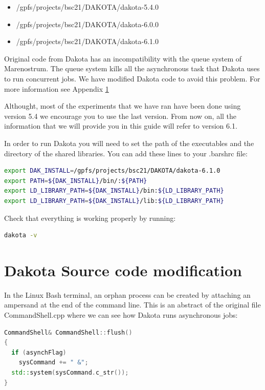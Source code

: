 \documentclass[12pt,a4paper,article]{memoir} %
\begin{document}
\begin{itemize}
\item /gpfs/projects/bsc21/DAKOTA/dakota-5.4.0
\item /gpfs/projects/bsc21/DAKOTA/dakota-6.0.0
\item /gpfs/projects/bsc21/DAKOTA/dakota-6.1.0
\end{itemize}

Original code from Dakota has an incompatibility with the queue system of Marenostrum. The queue system kills all the asynchronous task that Dakota uses to run concurrent jobs. We have modified Dakota code to avoid this problem. For more information see Appendix \ref{chapter:CodeMod}

Althought, most of the experiments that we have ran have been done using version 5.4 we encourage you to use the last version. From now on, all the information that we will provide you in this guide will refer to version 6.1.

In order to run Dakota you will need to set the path of the executables and the directory of the shared libraries. You can add these lines to your .barshrc file:

\begin{lstlisting}[style=MyCodeStyle,language=bash]
export DAK_INSTALL=/gpfs/projects/bsc21/DAKOTA/dakota-6.1.0
export PATH=${DAK_INSTALL}/bin/:${PATH}
export LD_LIBRARY_PATH=${DAK_INSTALL}/bin:${LD_LIBRARY_PATH}
export LD_LIBRARY_PATH=${DAK_INSTALL}/lib:${LD_LIBRARY_PATH}
\end{lstlisting}

Check that everything is working properly by running:

\begin{lstlisting}[style=MyCodeStyle,language=bash]
dakota -v
\end{lstlisting}

\appendix

\chapter{Dakota Source code modification}
\label{chapter:CodeMod}
In the Linux Bash terminal, an orphan process can be created by attaching an ampersand at the end of the command line. This is an abstract of the original file CommandShell.cpp where we can see how Dakota runs asynchronous jobs:

\begin{lstlisting}[style=MyCodeStyle,language=C++]
CommandShell& CommandShell::flush()
{
  if (asynchFlag)
    sysCommand += " &";
  std::system(sysCommand.c_str());
}
\end{lstlisting}
\end{document}
